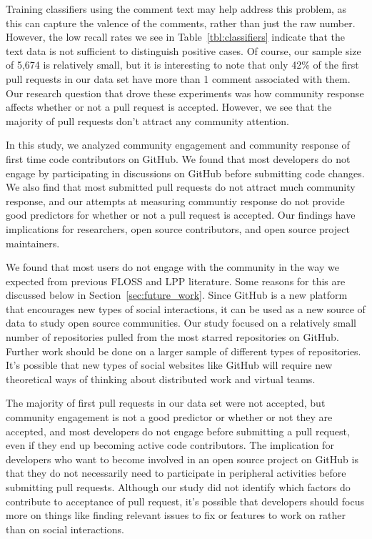 \documentclass{iitthesis}
\begin{document}
Training classifiers using the comment text may help address this problem, as
this can capture the valence of the comments, rather than just the raw number.
However, the low recall rates we see in Table~\ref{tbl:classifiers} indicate
that the text data is not sufficient to distinguish positive cases. Of course,
our sample size of 5,674 is relatively small, but it is interesting to note that
only 42\% of the first pull requests in our data set have more than 1 comment
associated with them. Our research question that drove these experiments was how
community response affects whether or not a pull request is accepted. However,
we see that the majority of pull requests don't attract any community attention.

 \label{chap:conclusion}

In this study, we analyzed community engagement and community response of first
time code contributors on GitHub. We found that most developers do not engage by
participating in discussions on GitHub before submitting code changes. We also
find that most submitted pull requests do not attract much community response,
and our attempts at measuring communtiy response do not provide good predictors
for whether or not a pull request is accepted. Our findings have implications
for researchers, open source contributors, and open source project maintainers.

We found that most users do not engage with the community in the way we expected
from previous FLOSS and LPP literature. Some reasons for this are discussed
below in Section~\ref{sec:future_work}. Since GitHub is a new platform that
encourages new types of social interactions, it can be used as a new source of
data to study open source communities. Our study focused on a relatively small
number of repositories pulled from the most starred repositories on GitHub.
Further work should be done on a larger sample of different types of
repositories. It's possible that new types of social websites like GitHub will
require new theoretical ways of thinking about distributed work and virtual
teams.

The majority of first pull requests in our data set were not accepted, but
community engagement is not a good predictor or whether or not they are
accepted, and most developers do not engage before submitting a pull request,
even if they end up becoming active code contributors. The implication for
developers who want to become involved in an open source project on GitHub is
that they do not necessarily need to participate in peripheral activities before
submitting pull requests. Although our study did not identify which factors do
contribute to acceptance of pull request, it's possible that developers should
focus more on things like finding relevant issues to fix or features to work on
rather than on social interactions.
\end{document}
